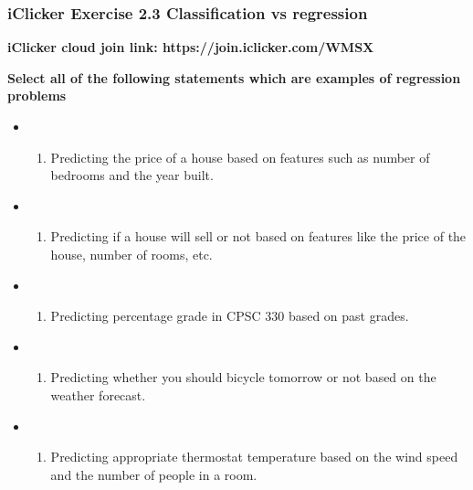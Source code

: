 \documentclass[11pt]{article}
\providecommand{\tightlist}{%
      \setlength{\itemsep}{0pt}\setlength{\parskip}{0pt}}
\begin{document}
    

    \subsubsection{iClicker Exercise 2.3 Classification vs
regression}\label{iclicker-exercise-2.3-classification-vs-regression}

\textbf{iClicker cloud join link: https://join.iclicker.com/WMSX}

\textbf{Select all of the following statements which are examples of
regression problems}

\begin{itemize}
\tightlist
\item
  \begin{enumerate}
  \def\labelenumi{(\Alph{enumi})}
  \tightlist
  \item
    Predicting the price of a house based on features such as number of
    bedrooms and the year built.
  \end{enumerate}
\item
  \begin{enumerate}
  \def\labelenumi{(\Alph{enumi})}
  \setcounter{enumi}{1}
  \tightlist
  \item
    Predicting if a house will sell or not based on features like the
    price of the house, number of rooms, etc.
  \end{enumerate}
\item
  \begin{enumerate}
  \def\labelenumi{(\Alph{enumi})}
  \setcounter{enumi}{2}
  \tightlist
  \item
    Predicting percentage grade in CPSC 330 based on past grades.
  \end{enumerate}
\item
  \begin{enumerate}
  \def\labelenumi{(\Alph{enumi})}
  \setcounter{enumi}{3}
  \tightlist
  \item
    Predicting whether you should bicycle tomorrow or not based on the
    weather forecast.
  \end{enumerate}
\item
  \begin{enumerate}
  \def\labelenumi{(\Alph{enumi})}
  \setcounter{enumi}{4}
  \tightlist
  \item
    Predicting appropriate thermostat temperature based on the wind
    speed and the number of people in a room.
  \end{enumerate}
\end{itemize}
\end{document}
